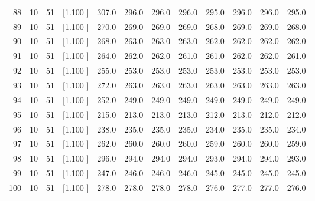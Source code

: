 \documentclass[12pt,a4paper]{article}
\begin{document}
\begin{center}
{\begin{tabular}{r r r r r r r r r r r r}
  88& 10& 51&[1.100     ]&   307.0&   296.0&   296.0&   296.0&   295.0&   296.0&   296.0&   295.0\\[-0.02in]
  89& 10& 51&[1.100     ]&   270.0&   269.0&   269.0&   269.0&   268.0&   269.0&   269.0&   268.0\\[-0.02in]
  90& 10& 51&[1.100     ]&   268.0&   263.0&   263.0&   263.0&   262.0&   262.0&   262.0&   262.0\\[-0.02in]
  91& 10& 51&[1.100     ]&   264.0&   262.0&   262.0&   261.0&   261.0&   262.0&   262.0&   261.0\\[-0.02in]
  92& 10& 51&[1.100     ]&   255.0&   253.0&   253.0&   253.0&   253.0&   253.0&   253.0&   253.0\\[-0.02in]
  93& 10& 51&[1.100     ]&   272.0&   263.0&   263.0&   263.0&   263.0&   263.0&   263.0&   263.0\\[-0.02in]
  94& 10& 51&[1.100     ]&   252.0&   249.0&   249.0&   249.0&   249.0&   249.0&   249.0&   249.0\\[-0.02in]
  95& 10& 51&[1.100     ]&   215.0&   213.0&   213.0&   213.0&   212.0&   213.0&   212.0&   212.0\\[-0.02in]
  96& 10& 51&[1.100     ]&   238.0&   235.0&   235.0&   235.0&   234.0&   235.0&   235.0&   234.0\\[-0.02in]
  97& 10& 51&[1.100     ]&   262.0&   260.0&   260.0&   260.0&   259.0&   260.0&   260.0&   259.0\\[-0.02in]
  98& 10& 51&[1.100     ]&   296.0&   294.0&   294.0&   294.0&   293.0&   294.0&   294.0&   293.0\\[-0.02in]
  99& 10& 51&[1.100     ]&   247.0&   246.0&   246.0&   246.0&   245.0&   245.0&   245.0&   245.0\\[-0.02in]
 100& 10& 51&[1.100     ]&   278.0&   278.0&   278.0&   278.0&   276.0&   277.0&   277.0&   276.0\\[-0.02in]

\hline
\end{tabular}}
\end{center}
\end{document}
